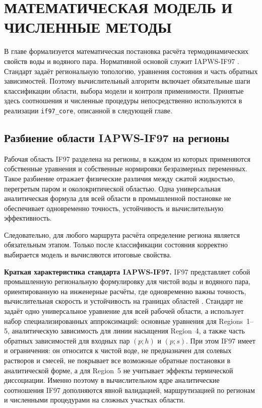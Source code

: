 \chapter{МАТЕМАТИЧЕСКАЯ МОДЕЛЬ И ЧИСЛЕННЫЕ МЕТОДЫ}

В главе формализуется математическая постановка расчёта
термодинамических свойств воды и водяного пара.
Нормативной основой служит IAPWS-IF97 \cite{iapws_if97_2012}.
Стандарт задаёт региональную топологию, уравнения состояния и часть обратных зависимостей.
Поэтому вычислительный алгоритм включает обязательные шаги
классификации области, выбора модели и контроля применимости.
Принятые здесь соотношения и численные процедуры
непосредственно используются в реализации \texttt{if97\_core},
описанной в следующей главе.

\section{Разбиение области IAPWS-IF97 на регионы}

Рабочая область IF97 разделена на регионы,
в каждом из которых применяются собственные уравнения
и собственные нормировки безразмерных переменных.
Такое разбиение отражает физические различия
между сжатой жидкостью, перегретым паром и околокритической областью.
Одна универсальная аналитическая формула для всей области
в промышленной постановке не обеспечивает одновременно
точность, устойчивость и вычислительную эффективность.

Следовательно, для любого маршрута расчёта
определение региона является обязательным этапом.
Только после классификации состояния корректно
выбирается модель и вычисляются итоговые свойства.

\noindent\textbf{Краткая характеристика стандарта IAPWS-IF97.}
IF97 представляет собой промышленную региональную формулировку
для чистой воды и водяного пара,
ориентированную на инженерные расчёты,
где одновременно важны точность,
вычислительная скорость
и устойчивость на границах областей \cite{iapws_if97_2012}.
Стандарт не задаёт одно универсальное уравнение
для всей рабочей области,
а использует набор специализированных аппроксимаций:
основные уравнения для Regions~1--5,
аналитическую зависимость для линии насыщения Region~4,
а также часть обратных зависимостей для входных пар
$(p; h)$ и $(p; s)$.
При этом IF97 имеет и ограничения:
он относится к чистой воде,
не предназначен для солевых растворов и смесей,
не покрывает все возможные обратные постановки
в аналитической форме,
а для Region~5 не учитывает эффекты термической диссоциации.
Именно поэтому в вычислительном ядре
аналитические соотношения IF97
дополняются явной валидацией,
маршрутизацией по регионам
и численными процедурами на сложных участках области.

